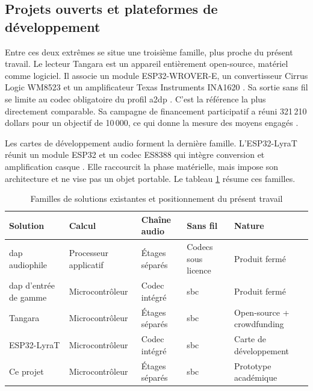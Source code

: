 \subsection{Projets ouverts et plateformes de développement}

Entre ces deux extrêmes se situe une troisième famille, plus proche du présent travail. Le lecteur Tangara est un appareil entièrement open-source, matériel comme logiciel. Il associe un module ESP32-WROVER-E, un convertisseur Cirrus Logic WM8523 et un amplificateur Texas Instruments INA1620 \cite{cooltech_tangara}. Sa sortie sans fil se limite au codec obligatoire du profil \gls{a2dp} \cite{cnx_tangara}. C'est la référence la plus directement comparable. Sa campagne de financement participatif a réuni 321\,210 dollars pour un objectif de 10\,000, ce qui donne la mesure des moyens engagés \cite{crowdsupply_tangara}.

Les cartes de développement audio forment la dernière famille. L'ESP32-LyraT réunit un module ESP32 et un codec ES8388 qui intègre conversion et amplification casque \cite{espressif_lyrat}. Elle raccourcit la phase matérielle, mais impose son architecture et ne vise pas un objet portable. Le tableau \ref{tab:etat-art-comparaison} résume ces familles.

\begin{table}[h]
      \centering
      \caption{Familles de solutions existantes et positionnement du présent travail}
      \label{tab:etat-art-comparaison}
      \small
      \begin{tabular}{lllll}
            \hline
            \textbf{Solution}           & \textbf{Calcul}       & \textbf{Chaîne audio} & \textbf{Sans fil}   & \textbf{Nature}            \\
            \hline
            \gls{dap} audiophile        & Processeur applicatif & Étages séparés        & Codecs sous licence & Produit fermé              \\
            \gls{dap} d'entrée de gamme & Microcontrôleur       & Codec intégré         & \gls{sbc}           & Produit fermé              \\
            Tangara                     & Microcontrôleur       & Étages séparés        & \gls{sbc}           & Open-source + crowdfunding \\
            ESP32-LyraT                 & Microcontrôleur       & Codec intégré         & \gls{sbc}           & Carte de développement     \\
            Ce projet                   & Microcontrôleur       & Étages séparés        & \gls{sbc}           & Prototype académique       \\
            \hline
      \end{tabular}
\end{table}


